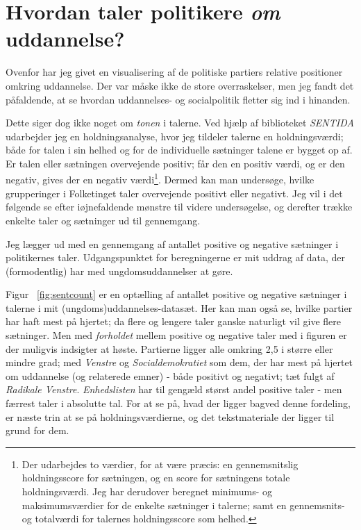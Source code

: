 \section{Hvordan taler politikere \textit{om} uddannelse?}
Ovenfor har jeg givet en visualisering af de politiske partiers relative positioner omkring uddannelse.
Der var måske ikke de store overraskelser, men jeg fandt det påfaldende, at se hvordan uddannelses- og socialpolitik fletter sig ind i hinanden.

Dette siger dog ikke noget om \textit{tonen} i talerne.
Ved hjælp af biblioteket \textit{SENTIDA} udarbejder jeg en holdningsanalyse, hvor jeg tildeler talerne en holdningsværdi; både for talen i sin helhed og for de individuelle sætninger talene er bygget op af.
Er talen eller sætningen overvejende positiv; får den en positiv værdi, og er den negativ, gives der en negativ værdi\footnote{Der udarbejdes to værdier, for at være præcis: en gennemsnitslig holdningsscore for sætningen, og en score for sætningens totale holdningsværdi. Jeg har derudover beregnet minimums- og maksimumsværdier for de enkelte sætninger i talerne; samt en gennemsnits- og totalværdi for talernes holdningsscore som helhed.}.
Dermed kan man undersøge, hvilke grupperinger i Folketinget taler overvejende positivt eller negativt.
Jeg vil i det følgende se efter iøjnefaldende mønstre til videre undersøgelse, og derefter trække enkelte taler og sætninger ud til gennemgang.

Jeg lægger ud med en gennemgang af antallet positive og negative sætninger i politikernes taler.
Udgangspunktet for beregningerne er mit uddrag af data, der (formodentlig) har med ungdomsuddannelser at gøre.

Figur ~\ref{fig:sentcount} er en optælling af antallet positive og negative sætninger i talerne i mit (ungdoms)uddannelses-datasæt.
Her kan man også se, hvilke partier har haft mest på hjertet; da flere og lengere taler ganske naturligt vil give flere sætninger.
Men med \textit{forholdet} mellem positive og negative taler med i figuren er der muligvis indsigter at høste.
Partierne ligger alle omkring 2,5 i større eller mindre grad; med \textit{Venstre} og \textit{Socialdemokratiet} som dem, der har mest på hjertet om uddannelse (og relaterede emner) - både positivt og negativt; tæt fulgt af \textit{Radikale Venstre}.
\textit{Enhedslisten} har til gengæld størst andel positive taler - men færrest taler i absolutte tal.
For at se på, hvad der ligger bagved denne fordeling, er næste trin at se på holdningsværdierne, og det tekstmateriale der ligger til grund for dem.

